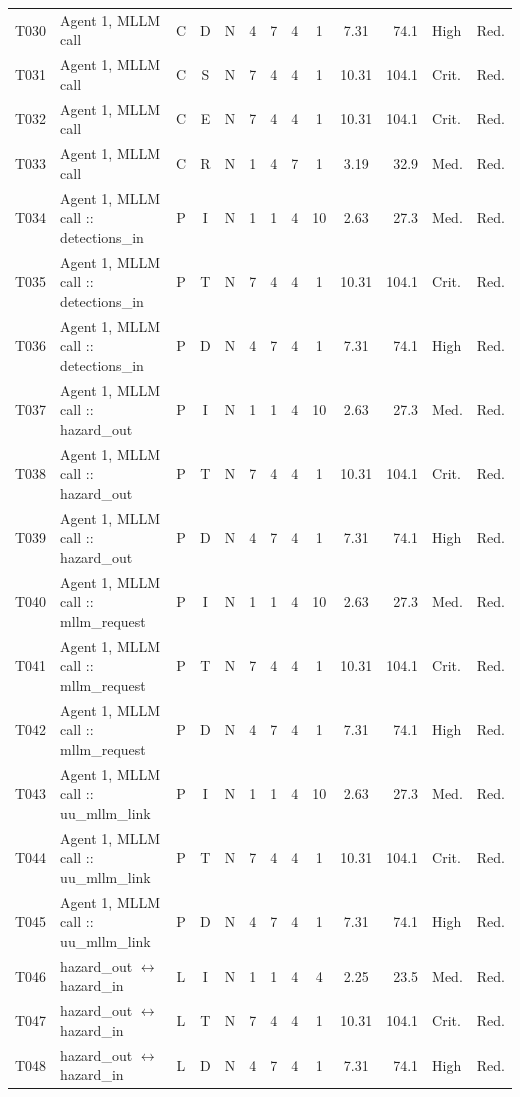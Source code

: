 \documentclass[9pt]{extarticle}
\begin{document}
\begin{longtable}{l>{\raggedright\arraybackslash}p{6.3cm}ccccccccrll}
T030 & Agent 1, MLLM call & C & D & N & 4 & 7 & 4 & 1 & 7.31 & 74.1 & High & Red. \\
T031 & Agent 1, MLLM call & C & S & N & 7 & 4 & 4 & 1 & 10.31 & 104.1 & Crit. & Red. \\
T032 & Agent 1, MLLM call & C & E & N & 7 & 4 & 4 & 1 & 10.31 & 104.1 & Crit. & Red. \\
T033 & Agent 1, MLLM call & C & R & N & 1 & 4 & 7 & 1 & 3.19 & 32.9 & Med. & Red. \\
T034 & Agent 1, MLLM call :: detections\_in & P & I & N & 1 & 1 & 4 & 10 & 2.63 & 27.3 & Med. & Red. \\
T035 & Agent 1, MLLM call :: detections\_in & P & T & N & 7 & 4 & 4 & 1 & 10.31 & 104.1 & Crit. & Red. \\
T036 & Agent 1, MLLM call :: detections\_in & P & D & N & 4 & 7 & 4 & 1 & 7.31 & 74.1 & High & Red. \\
T037 & Agent 1, MLLM call :: hazard\_out & P & I & N & 1 & 1 & 4 & 10 & 2.63 & 27.3 & Med. & Red. \\
T038 & Agent 1, MLLM call :: hazard\_out & P & T & N & 7 & 4 & 4 & 1 & 10.31 & 104.1 & Crit. & Red. \\
T039 & Agent 1, MLLM call :: hazard\_out & P & D & N & 4 & 7 & 4 & 1 & 7.31 & 74.1 & High & Red. \\
T040 & Agent 1, MLLM call :: mllm\_request & P & I & N & 1 & 1 & 4 & 10 & 2.63 & 27.3 & Med. & Red. \\
T041 & Agent 1, MLLM call :: mllm\_request & P & T & N & 7 & 4 & 4 & 1 & 10.31 & 104.1 & Crit. & Red. \\
T042 & Agent 1, MLLM call :: mllm\_request & P & D & N & 4 & 7 & 4 & 1 & 7.31 & 74.1 & High & Red. \\
T043 & Agent 1, MLLM call :: uu\_mllm\_link & P & I & N & 1 & 1 & 4 & 10 & 2.63 & 27.3 & Med. & Red. \\
T044 & Agent 1, MLLM call :: uu\_mllm\_link & P & T & N & 7 & 4 & 4 & 1 & 10.31 & 104.1 & Crit. & Red. \\
T045 & Agent 1, MLLM call :: uu\_mllm\_link & P & D & N & 4 & 7 & 4 & 1 & 7.31 & 74.1 & High & Red. \\
T046 & hazard\_out $\leftrightarrow$ hazard\_in & L & I & N & 1 & 1 & 4 & 4 & 2.25 & 23.5 & Med. & Red. \\
T047 & hazard\_out $\leftrightarrow$ hazard\_in & L & T & N & 7 & 4 & 4 & 1 & 10.31 & 104.1 & Crit. & Red. \\
T048 & hazard\_out $\leftrightarrow$ hazard\_in & L & D & N & 4 & 7 & 4 & 1 & 7.31 & 74.1 & High & Red. \\

\end{longtable}
\end{document}
